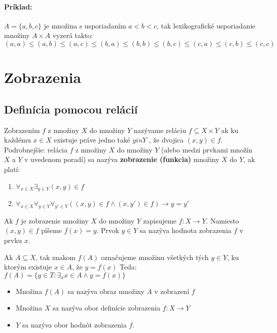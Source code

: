 		\paragraph{Príklad: }
		$A = \{a,b,c\}$ je množina s usporiadaním $a < b < c $, tak lexikografické usporiadanie množiny $A \times A$ vyzerá takto: $(a,a) \leq ( a,b) \leq ( a,c) \leq (b,a) \leq (b,b) \leq (b,c) \leq ( c,a) \leq ( c,b) \leq ( c,c)$

\section{Zobrazenia}

	\subsection{Definícia pomocou relácií} 

		Zobrazením $f$ z množiny $X$ do množiny $Y$ nazývame reláciu $f \subseteq X \times Y$ ak ku každému $x \in X$ existuje práve jedno také $y in Y$ , že dvojica $( x, y ) \in f$.\\

		Podrobnejšie: relácia $f$ z množiny $X$ do množiny $Y$ (alebo medzi prvkami množín $X$ a $Y$ v uvedenom poradí) sa nazýva \textbf{zobrazenie (funkcia)} množiny $X$ do $Y$, ak platí:
		\begin{enumerate}
			\item $\forall_{x \in X} \exists_{y \in Y} (x, y) \in f $
			\item $\forall_{x \in X} \forall_{y \in Y} \forall_{y' \in Y} ((x, y) \in f \wedge (x, y') \in f ) \rightarrow y = y'$
		\end{enumerate}





		Ak $f$ je zobrazenie množiny $X$ do množiny $Y$ zapisujeme $f : X \rightarrow Y$. 
		Namiesto $( x, y) \in f$ píšeme $ f( x) = y $. Prvok $ y \in Y $ sa nazýva hodnota zobrazenia $f$ v prvku $x$.

		Ak $A \subseteq X$, tak znakom $f ( A)$ označujeme množinu všetkých tých $y \in Y$, ku ktorým existuje $x \in A$, že $y = f ( x)$ Teda: 
		$f(A) = \{y \in T: \exists_{x}x \in A \wedge y = f(x) \}$\\

		\begin{itemize}
			\item Množina $f ( A)$ sa nazýva obraz množiny $A$ v zobrazení $f$
			\item Množina $X$ sa nazýva obor definície zobrazenia $f : X \rightarrow Y$
			\item $Y$ sa nazýva obor hodnôt zobrazenia $f$.
		\end{itemize}

